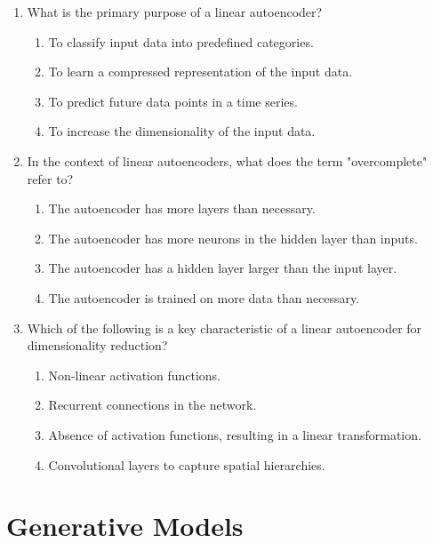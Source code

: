 \documentclass{report}
\numberwithin{equation}{section}
\begin{document}
\begin{enumerate}
\begin{enumerate}[label=\alph*.]
\end{enumerate}
\item What is the primary purpose of a linear autoencoder?
\begin{enumerate}[label=\alph*.]
\item To classify input data into predefined categories.
\item To learn a compressed representation of the input data.
    \item To predict future data points in a time series.
    \item To increase the dimensionality of the input data.
\end{enumerate}

\item In the context of linear autoencoders, what does the term "overcomplete" refer to?
\begin{enumerate}[label=\alph*.]
\item The autoencoder has more layers than necessary.
\item The autoencoder has more neurons in the hidden layer than inputs.
\item The autoencoder has a hidden layer larger than the input layer.
\item The autoencoder is trained on more data than necessary.
\end{enumerate}

\item Which of the following is a key characteristic of a linear autoencoder for dimensionality reduction?
\begin{enumerate}[label=\alph*.]
\item Non-linear activation functions.
\item Recurrent connections in the network.
\item Absence of activation functions, resulting in a linear transformation.
\item Convolutional layers to capture spatial hierarchies.
\end{enumerate}
\end{enumerate}
\section{Generative Models}
\end{document}
